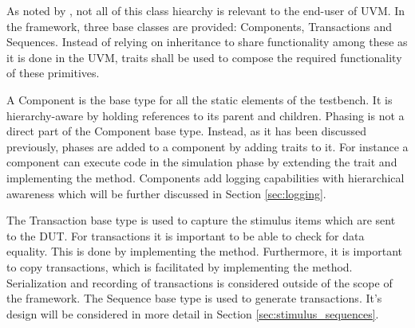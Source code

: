 As noted by \citeauthor{sutherland2015uvm} \cite{sutherland2015uvm}, not all of this class hiearchy is relevant to
the end-user of UVM. In the framework, three base classes are provided: Components, Transactions and Sequences.
Instead of relying on inheritance to share functionality among these as it is done in the UVM, traits shall be used
to compose the required functionality of these primitives.

A Component is the base type for all the static elements of the testbench. It is hierarchy-aware by holding
references to its parent and children. Phasing is not a direct part of the Component base type. Instead, as it has
been discussed previously, phases are added to a component by adding traits to it. For instance a component can
execute code in the simulation phase by extending the  trait and implementing the 
method. Components add logging capabilities with hierarchical awareness which will be further discussed in Section
\ref{sec:logging}.

The Transaction base type is used to capture the stimulus items which are sent to the DUT. For transactions it is
important to be able to check for data equality. This is done by implementing the  method.
Furthermore, it is important to copy transactions, which is facilitated by implementing the  method.
Serialization and recording of transactions is considered outside of the scope of the framework. The Sequence base
type is used to generate transactions. It's design will be considered in more detail in Section \ref{sec:stimulus_sequences}.


